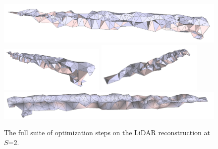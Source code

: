 \documentclass[12pt]{drexelthesis}
\begin{document}
\begin{figure}[!ht]
	\centering
		\includegraphics[width=5in]{real-lab-scans/optimizedNeat/scalespace2everything00.png}
		\includegraphics[width=2in]{real-lab-scans/optimizedNeat/scalespace2everything01.png}
		\includegraphics[width=2in]{real-lab-scans/optimizedNeat/scalespace2everything02.png}
		\includegraphics[width=5in]{real-lab-scans/optimizedNeat/scalespace2everything03.png}
		\caption[The full suite of optimization steps on the LiDAR reconstruction at $S$=2.]{\centering The full suite of optimization steps on the LiDAR reconstruction at $S$=2.}
	\label{lidar:scalespace2everything}
\end{figure}
\end{document}
